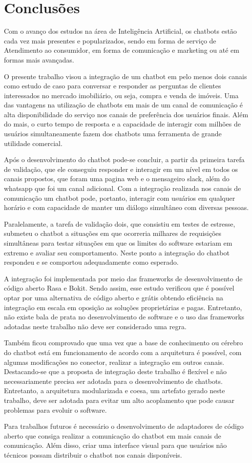 \chapter{Conclusões}

Com o avanço dos estudos na área de Inteligência
Artificial, os chatbots estão cada vez mais presentes e popularizados, sendo em
forma de serviço de Atendimento ao consumidor, em forma de comunicação e marketing ou até em formas mais
avançadas.


O presente trabalho visou a integração de um chatbot em pelo menos dois canais como estudo de caso para conversar e responder as perguntas de clientes interessados no mercado imobiliário, ou seja, compra e venda de imóveis. Uma das vantagens na utilização de chatbots em mais de um canal de comunicação é alta disponibilidade do serviço nos canais de preferência dos usuários finais. Além do mais, o curto tempo de resposta e a capacidade de interagir com milhões de usuários simultaneamente fazem dos chatbots uma ferramenta de grande utilidade comercial. 

Após o desenvolvimento do chatbot pode-se concluir, a partir da primeira tarefa de validação, que ele conseguiu responder e interagir em um nível em todos os canais propostos, que foram uma pagina web e o mensageiro slack, além do whatsapp que foi um canal adicional. Com a integração realizada nos canais de comunicação um chatbot pode, portanto, interagir com usuários em qualquer horário e com capacidade de manter um diálogo simultâneo com diversas pessoas.

Paralelamente, a tarefa de validação dois, que consistiu em testes de estresse, submeteu o chatbot a situações em que ocorreria milhares de requisições simultâneas para testar situações em que os limites do software estariam em extremo e avaliar seu comportamento. Neste ponto a integração do chatbot respondeu e se comportou adequadamente como esperado.

A integração foi implementada por meio das frameworks de desenvolvimento de código aberto Rasa e Bokit. Sendo assim, esse estudo verificou que é possível optar por uma alternativa de código aberto e grátis obtendo eficiência na integração em escala em oposição as soluções proprietárias e pagas. Entretanto, não existe bala de prata no desenvolvimento de software e o uso das frameworks adotadas neste trabalho não deve ser considerado uma regra.

Também ficou comprovado que uma vez que a base de conhecimento ou cérebro do chatbot está em funcionamento de acordo com a arquitetura é possível, com algumas modificações no conector, realizar a integração em outros canais. Destacando-se que a proposta de integração deste trabalho é flexível e não necessariamente precisa ser adotada para o desenvolvimento de chatbots. Entretanto, a arquitetura modularizada e coesa, um artefato gerado neste trabalho, deve ser adotada para evitar um alto acoplamento que pode causar problemas para evoluir o software. 



Para trabalhos futuros é necessário o desenvolvimento de adaptadores de código aberto que consiga realizar a comunicação do chatbot em mais canais de comunicação. Além disso, criar uma interface visual para que usuários não técnicos possam distribuir o chatbot nos canais disponíveis. 

